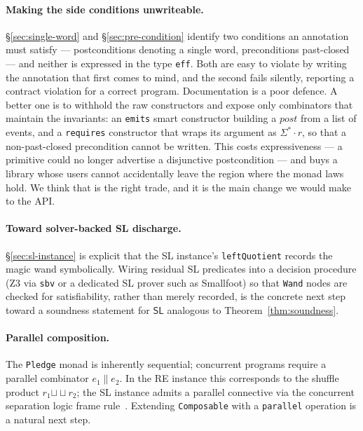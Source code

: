\documentclass[acmsmall,screen]{acmart}
\newcommand{\SL}{\mathsf{SL}}
\newcommand{\post}{\mathit{post}}
\newcommand{\shuffle}{\mathbin{\sqcup\!\!\!\sqcup}}
\begin{document}
\paragraph{Making the side conditions unwriteable.}
\S\ref{sec:single-word} and \S\ref{sec:pre-condition} identify two
conditions an annotation must satisfy --- postconditions denoting a single
word, preconditions past-closed --- and neither is expressed in the type
\lstinline{eff}.
Both are easy to violate by writing the annotation that first comes to
mind, and the second fails silently, reporting a contract violation for a
correct program.
Documentation is a poor defence.
A better one is to withhold the raw constructors and expose only
combinators that maintain the invariants: an \lstinline{emits} smart
constructor building a $\post$ from a list of events, and a
\lstinline{requires} constructor that wraps its argument as
$\Sigma^* \cdot r$, so that a non-past-closed precondition cannot be
written.
This costs expressiveness --- a primitive could no longer advertise a
disjunctive postcondition --- and buys a library whose users cannot
accidentally leave the region where the monad laws hold.
We think that is the right trade, and it is the main change we would make
to the API.

\paragraph{Toward solver-backed SL discharge.}
\S\ref{sec:sl-instance} is explicit that the SL instance's
\lstinline{leftQuotient} records the magic wand symbolically.
Wiring residual SL predicates into a decision procedure (Z3 via
\lstinline{sbv} or a dedicated SL prover such as Smallfoot) so that
\lstinline{Wand} nodes are checked for satisfiability, rather than merely
recorded, is the concrete next step toward a soundness statement for $\SL$
analogous to Theorem~\ref{thm:soundness}.

\paragraph{Parallel composition.}
The \lstinline{Pledge} monad is inherently sequential; concurrent programs
require a parallel combinator $e_1 \parallel e_2$.
In the RE instance this corresponds to the shuffle product $r_1 \shuffle r_2$;
the SL instance admits a parallel connective via the concurrent separation
logic frame rule~\cite{o2007resources}.
Extending \lstinline{Composable} with a \lstinline{parallel} operation is a
natural next step.
\end{document}
